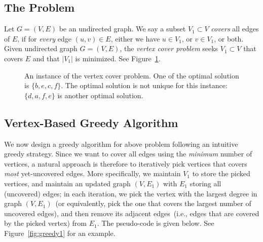 \subsection*{The Problem}

Let $G = (V, E)$ be an undirected graph. We say a subset $V_1\subset V$
\emph{covers} all edges of $E$, if for \emph{every} edge $(u,v)\in E$,
either we have $u\in V_1$, or $v\in V_1$, or both.
Given undirected graph $G = (V, E)$,
the \emph{vertex cover problem} seeks $V_1\subset V$ that covers $E$
and that $|V_1|$ is minimized. See Figure~\ref{fig:cover}.

\begin{figure}[h]
\centering{}
\caption{An instance of the vertex cover problem.
One of the optimal solution is $\{b,e,c,f\}$.
The optimal solution is not unique for this instance:
$\{d,a,f,e\}$ is another optimal solution.}
\label{fig:cover}
\end{figure}

\subsection*{Vertex-Based Greedy Algorithm}

We now design a greedy algorithm for above problem
following an intuitive greedy strategy.
Since we want to cover all edges using the \emph{minimum} number of vertices,
a natural approach is therefore to iteratively pick vertices that covers \emph{most} yet-uncovered edges.
More specifically, we maintain $V_1$ to store the picked vertices,
and maintain an updated graph $(V, E_1)$ with $E_1$ storing all (uncovered) edges; in each iteration,
we pick the vertex with the largest degree in graph $(V, E_1)$~(or equivalently, pick the one that covers the
largest number of uncovered edges), and then remove its adjacent
edges~(i.e., edges that are covered by the picked vertex) from $E_1$.
The pseudo-code is given below. See Figure~\ref{fig:greedy1} for an example.

\begin{algorithmblock}[0.8\textwidth]
	\xxx
	\xxx
	\xxx
	\xxx
	\xxx
	\xxx
	\xxx
	\xxx
\end{algorithmblock}

